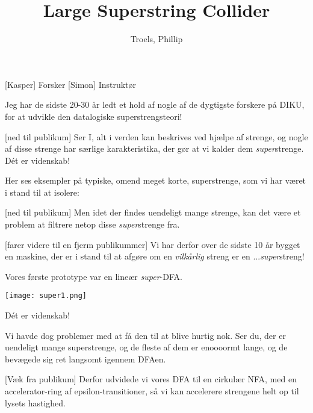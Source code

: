 \documentclass[a4paper,11pt]{article}
\title{Large Superstring Collider}
\author{Troels, Phillip}
\begin{document}
\maketitle
\begin{roles}
  [Kasper] Forsker
  [Simon] Instruktør
\end{roles}
\begin{props}
\end{props}

\begin{sketch}


 Jeg har de sidste 20-30 år ledt et hold af nogle af de
dygtigste forskere på DIKU, for at udvikle den datalogiske
superstrengsteori!

[ned til publikum] Ser I, alt i verden kan beskrives ved
hjælpe af strenge, og nogle af disse strenge har særlige
karakteristika, der gør at vi kalder dem
\textit{super}strenge.  Dét er videnskab!

 Her ses eksempler på typiske, omend meget korte,
superstrenge, som vi har været i stand til at isolere:


[ned til publikum] Men idet der findes uendeligt mange
strenge,  kan det være et problem at filtrere netop disse
\textit{super}strenge fra.

[farer videre til en fjerm publikummer] Vi har derfor over de
sidste 10 år bygget en maskine,  der er i stand
til at afgøre om en \textit{vilkårlig} streng er en
...\textit{super}streng!

 Vores første prototype var en lineær \textit{super}-DFA.

\texttt{[image: super1.png]}

 Dét er videnskab!

 Vi havde dog problemer med at få den til at blive hurtig
nok.  Ser du, der er uendeligt mange
superstrenge,  og de fleste af dem er enoooormt lange,
 og de bevægede sig ret langsomt igennem DFAen.

[Væk fra publikum] Derfor udvidede vi vores DFA til en
cirkulær NFA, med en accelerator-ring af epsilon-transitioner, så vi
kan accelerere strengene helt op til lysets hastighed.


\end{sketch}
\end{document}
